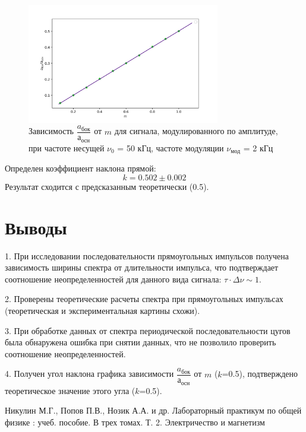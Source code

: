 \documentclass[a4paper,12pt]{article} %
\begin{document}
\begin{figure}[h!]
\begin{center}
\includegraphics[width=0.75\textwidth]{a(m)}
\caption{Зависимость $\dfrac{a_{бок}}{а_{осн}}$ от $m$ для сигнала, модулированного по амплитуде, при частоте несущей $\nu_0$ = 50 кГц, частоте модуляции $\nu_{мод}$ = 2 кГц} \label{mod_img}
\end{center}
\end{figure}
Определен коэффициент наклона прямой:
\begin{equation}
k = 0.502 \pm 0.002
\end{equation} 
Результат сходится с предсказанным теоретически (0.5).

\section{Выводы}


\hspace{4mm} 1. При исследовании последовательности прямоугольных импульсов получена зависимость ширины спектра от длительности импульса, что подтверждает соотношение неопределенностей для данного вида сигнала: $\tau \cdot \Delta\nu \sim 1$.

2. Проверены теоретические расчеты спектра при прямоугольных импульсах (теоретическая и экспериментальная картины схожи).

3. При обработке данных от спектра периодической последовательности цугов была обнаружена ошибка при снятии данных, что не позволило проверить соотношение неопределенностей.

4. Получен угол наклона графика зависимости $\dfrac{a_{бок}}{а_{осн}}$ от $m$ ($k$=0.5), подтверждено теоретическое значение этого угла ($k$=0.5).


\begin{thebibliography}{}
      Никулин М.Г., Попов П.В., Нозик А.А. и др. Лабораторный практикум по общей физике : учеб. пособие. В трех томах. Т. 2. Электричество и магнетизм
\end{thebibliography}
\end{document}
